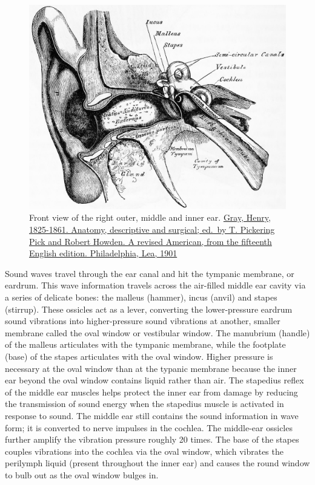 \begin{figure}

{\centering \includegraphics[width=0.7\linewidth]{./figures/auditory/GrayEar} 

}

\caption{Front view of the right outer, middle and inner ear. \href{https://archive.org/details/anatomydescripti00grayuoft/page/n6/mode/2up}{Gray, Henry, 1825-1861. Anatomy, descriptive and surgical; ed.~by T. Pickering Pick and Robert Howden. A revised American, from the fifteenth English edition. Philadelphia, Lea, 1901}}\label{fig:rightear}
\end{figure}

Sound waves travel through the ear canal and hit the tympanic membrane, or eardrum. This wave information travels across the air-filled middle ear cavity via a series of delicate bones: the malleus (hammer), incus (anvil) and stapes (stirrup). These ossicles act as a lever, converting the lower-pressure eardrum sound vibrations into higher-pressure sound vibrations at another, smaller membrane called the oval window or vestibular window. The manubrium (handle) of the malleus articulates with the tympanic membrane, while the footplate (base) of the stapes articulates with the oval window. Higher pressure is necessary at the oval window than at the typanic membrane because the inner ear beyond the oval window contains liquid rather than air. The stapedius reflex of the middle ear muscles helps protect the inner ear from damage by reducing the transmission of sound energy when the stapedius muscle is activated in response to sound. The middle ear still contains the sound information in wave form; it is converted to nerve impulses in the cochlea.
The middle-ear ossicles further amplify the vibration pressure roughly 20 times. The base of the stapes couples vibrations into the cochlea via the oval window, which vibrates the perilymph liquid (present throughout the inner ear) and causes the round window to bulb out as the oval window bulges in.

